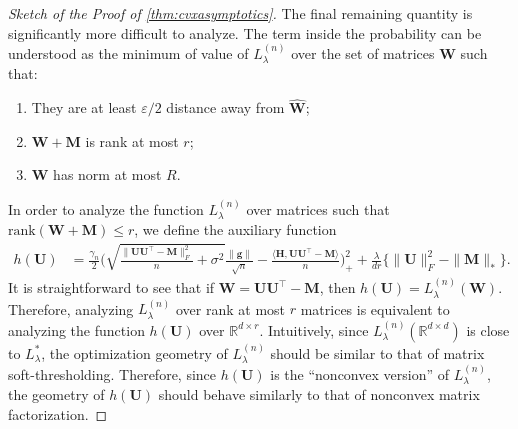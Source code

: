 \documentclass[10pt]{article}
\newcommand{\eps}{\ensuremath{\varepsilon}}
\newcommand{\s}{^*}
\renewcommand{\t}{^{\top}}
\renewcommand{\hat}{\widehat}
\theoremstyle{definition}
\begin{document}
\begin{proof}[Sketch of the Proof of \cref{thm:cvxasymptotics}]
The final remaining quantity is significantly more difficult to analyze.  The term inside the probability can be understood as the minimum of value of $L_{\lambda}^{(n)}$ over the set of matrices $\bm{W}$ such that:
\begin{enumerate}
    \item  They are at least $\eps/2$ distance away from $\bm{\hat W}$;
    \item $\bm{W} + \bm{M}$ is rank at most $r$;
    \item $\bm{W}$ has norm at most $R$.
\end{enumerate}
In order to analyze the function $L_{\lambda}^{(n)}$ over matrices such that $\mathrm{rank}(\bm{W} + \bm{M}) \leq r $, we define the auxiliary function
\begin{align}
    h(\bm{U}) &= \frac{\gamma_n}{2} \bigg( \sqrt{\frac{\|\bm{UU}\t - \bm{M}\|_F^2}{n} + \sigma^2} \frac{\|\bm{g}\|}{\sqrt{n}} - \frac{\langle \bm{H}, \bm{UU}\t - \bm{M}\rangle}{n} \bigg)_+^2 + \frac{\lambda}{dr} \big\{ \| \bm{U}\|_F^2 - \|\bm{M}\|_* \big\}.
\end{align}
It is straightforward to see that if $\bm{W} = \bm{UU}\t - \bm{M}$, then $h(\bm{U}) = L_{\lambda}^{(n)}(\bm{W})$.  Therefore, analyzing $L_{\lambda}^{(n)}$ over rank at most $r$ matrices is equivalent to analyzing the function $h(\bm{U})$ over $\mathbb{R}^{d \times r}$.   Intuitively, since  $L_{\lambda}^{(n)}(\mathbb{R}^{d \times d})$ is close to $L_{\lambda}\s$, the optimization geometry of $L_{\lambda}^{(n)}$ should be similar to that of matrix soft-thresholding.  Therefore, since $h(\bm{U})$ is the ``nonconvex version'' of $L_{\lambda}^{(n)}$, the geometry of $h(\bm{U})$ should behave similarly to that of nonconvex matrix factorization.  


\end{proof}
\end{document}
